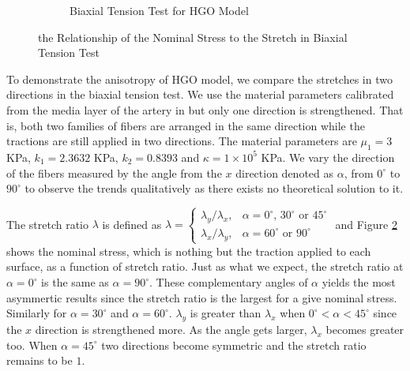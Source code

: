 \begin{figure}[H]
\begin{subfigure}[b]{0.45\textwidth}
		\caption{Biaxial Tension Test for HGO Model}
		\label{fig:biaxial2}
	\end{subfigure}
	\caption{the Relationship of the Nominal Stress to the Stretch in Biaxial Tension Test}
\end{figure}


To demonstrate the anisotropy of HGO model, we compare the stretches in two directions in the biaxial tension test. We use the material parameters calibrated from the media layer of the artery in \cite{Holzapfel2} but only one direction is strengthened. That is, both two families of fibers are arranged in the same direction while the tractions are still applied in two directions. The material parameters are $\mu_1 = 3$ KPa, $k_1 = 2.3632$ KPa, $k_2 = 0.8393$ and $\kappa = 1 \times 10^5$ KPa. We vary the direction of the fibers measured by the angle from the $x$ direction denoted as $\alpha$, from $0^\circ$ to $90^\circ$ to observe the trends qualitatively as there exists no theoretical solution to it. 

The stretch ratio $\lambda$ is defined as $\lambda = 
\begin{cases}
	\lambda_y/\lambda_x, & \text{$\alpha = 0^\circ$, $30^\circ$ or $45^\circ$} \\
	\lambda_x/\lambda_y, & \text{$\alpha = 60^\circ$ or $90^\circ$}
\end{cases}
$ 
and Figure \ref{fig:biaxial2} shows the nominal stress, which is nothing but the traction applied to each surface, as a function of stretch ratio. Just as what we expect, the stretch ratio at $\alpha = 0^\circ$ is the same as $\alpha = 90^\circ$. These complementary angles of $\alpha$ yields the most asymmertic results since the stretch ratio is the largest for a give nominal stress. Similarly for $\alpha = 30^\circ$ and $\alpha = 60^\circ$. 
$\lambda_y$ is greater than $\lambda_x$ when $0^\circ < \alpha < 45^\circ$ since the $x$ direction is strengthened more. As the angle gets larger, $\lambda_x$ becomes greater too. When $\alpha = 45^\circ$ two directions become symmetric and the stretch ratio remains to be $1$.
 


